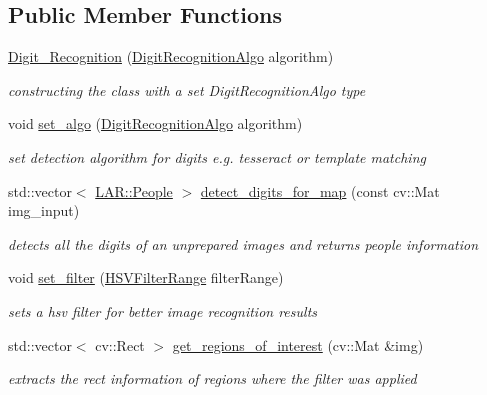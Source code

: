\subsection*{Public Member Functions}
\begin{DoxyCompactItemize}
\item 
\mbox{\hyperlink{class_image_processing_1_1_digit___recognition_a24fef82ef6c94ddda8c841f9eb408872}{Digit\+\_\+\+Recognition}} (\mbox{\hyperlink{namespace_image_processing_afe66b5cb462eb22dcf108308418c09eb}{Digit\+Recognition\+Algo}} algorithm)
\begin{DoxyCompactList}\small\item\em constructing the class with a set Digit\+Recognition\+Algo type \end{DoxyCompactList}\item 
\mbox{\label{class_image_processing_1_1_digit___recognition_a7bd2d754921d45fcb83e7f58aa906b93}} 
void \mbox{\hyperlink{class_image_processing_1_1_digit___recognition_a7bd2d754921d45fcb83e7f58aa906b93}{set\+\_\+algo}} (\mbox{\hyperlink{namespace_image_processing_afe66b5cb462eb22dcf108308418c09eb}{Digit\+Recognition\+Algo}} algorithm)
\begin{DoxyCompactList}\small\item\em set detection algorithm for digits e.\+g. tesseract or template matching \end{DoxyCompactList}\item 
\mbox{\label{class_image_processing_1_1_digit___recognition_a80d9b59f207de79970a374d0bb92e3ab}} 
std\+::vector$<$ \mbox{\hyperlink{class_l_a_r_1_1_people}{L\+A\+R\+::\+People}} $>$ \mbox{\hyperlink{class_image_processing_1_1_digit___recognition_a80d9b59f207de79970a374d0bb92e3ab}{detect\+\_\+digits\+\_\+for\+\_\+map}} (const cv\+::\+Mat img\+\_\+input)
\begin{DoxyCompactList}\small\item\em detects all the digits of an unprepared images and returns people information \end{DoxyCompactList}\item 
void \mbox{\hyperlink{class_image_processing_1_1_digit___recognition_adfae039ca51d000e71273256b3eb9279}{set\+\_\+filter}} (\mbox{\hyperlink{struct_image_processing_1_1_h_s_v_filter_range}{H\+S\+V\+Filter\+Range}} filter\+Range)
\begin{DoxyCompactList}\small\item\em sets a hsv filter for better image recognition results \end{DoxyCompactList}\item 
std\+::vector$<$ cv\+::\+Rect $>$ \mbox{\hyperlink{class_image_processing_1_1_digit___recognition_a365719825f80b3f5c503d88b43b5fc25}{get\+\_\+regions\+\_\+of\+\_\+interest}} (cv\+::\+Mat \&img)
\begin{DoxyCompactList}\small\item\em extracts the rect information of regions where the filter was applied \end{DoxyCompactList}\end{DoxyCompactItemize}
